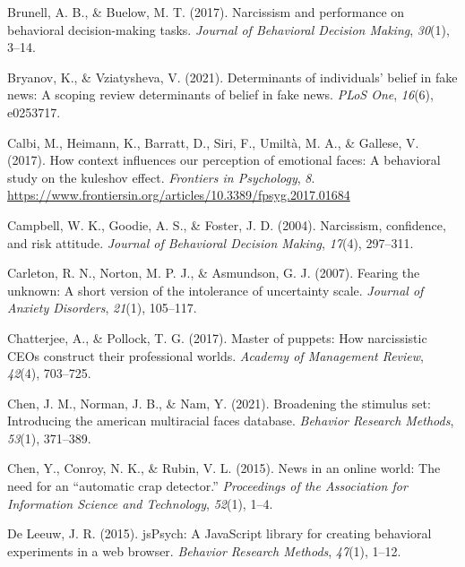\documentclass[
  man,floatsintext]{apa6}
\newlength{\cslhangindent}
\newlength{\cslentryspacingunit} %
\newenvironment{CSLReferences}[2] %
 {%
  \setlength{\parindent}{0pt}
  \ifodd #1
  \let\oldpar\par
  \def\par{\hangindent=\cslhangindent\oldpar}
  \fi
  \setlength{\parskip}{#2\cslentryspacingunit}
 }%
 {}
\begin{document}
\begin{CSLReferences}{1}{0}
\leavevmode{}%
Brunell, A. B., \& Buelow, M. T. (2017). Narcissism and performance on behavioral decision-making tasks. \emph{Journal of Behavioral Decision Making}, \emph{30}(1), 3--14.

\leavevmode{}%
Bryanov, K., \& Vziatysheva, V. (2021). Determinants of individuals' belief in fake news: A scoping review determinants of belief in fake news. \emph{PLoS One}, \emph{16}(6), e0253717.

\leavevmode{}%
Calbi, M., Heimann, K., Barratt, D., Siri, F., Umiltà, M. A., \& Gallese, V. (2017). How context influences our perception of emotional faces: A behavioral study on the kuleshov effect. \emph{Frontiers in Psychology}, \emph{8}. \url{https://www.frontiersin.org/articles/10.3389/fpsyg.2017.01684}

\leavevmode{}%
Campbell, W. K., Goodie, A. S., \& Foster, J. D. (2004). Narcissism, confidence, and risk attitude. \emph{Journal of Behavioral Decision Making}, \emph{17}(4), 297--311.

\leavevmode{}%
Carleton, R. N., Norton, M. P. J., \& Asmundson, G. J. (2007). Fearing the unknown: A short version of the intolerance of uncertainty scale. \emph{Journal of Anxiety Disorders}, \emph{21}(1), 105--117.

\leavevmode{}%
Chatterjee, A., \& Pollock, T. G. (2017). Master of puppets: How narcissistic CEOs construct their professional worlds. \emph{Academy of Management Review}, \emph{42}(4), 703--725.

\leavevmode{}%
Chen, J. M., Norman, J. B., \& Nam, Y. (2021). Broadening the stimulus set: Introducing the american multiracial faces database. \emph{Behavior Research Methods}, \emph{53}(1), 371--389.

\leavevmode{}%
Chen, Y., Conroy, N. K., \& Rubin, V. L. (2015). News in an online world: The need for an {``automatic crap detector.''} \emph{Proceedings of the Association for Information Science and Technology}, \emph{52}(1), 1--4.

\leavevmode{}%
De Leeuw, J. R. (2015). jsPsych: A JavaScript library for creating behavioral experiments in a web browser. \emph{Behavior Research Methods}, \emph{47}(1), 1--12.


\end{CSLReferences}
\end{document}
